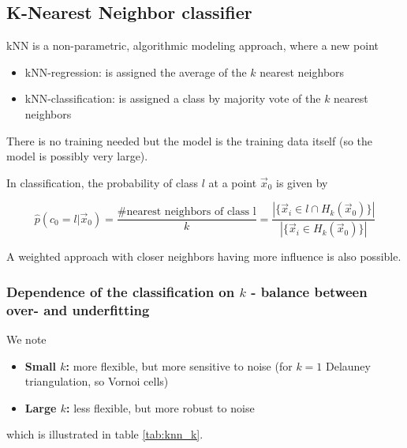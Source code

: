 

\subsection{K-Nearest Neighbor classifier}
kNN is a non-parametric, algorithmic modeling approach, where a new point
\begin{itemize}
    \item kNN-regression: is assigned the average of the $k$ nearest neighbors
    \item kNN-classification: is assigned a class by majority vote of the $k$ nearest neighbors
\end{itemize}
There is \textcolor{green1}{no training needed} but the \textcolor{red1}{model is the training data itself (so the model is possibly very large)}.

In classification, the probability of class $l$ at a point $\vec{x}_0$ is given by

\begin{equation}
    \hat{p}(c_0 = l|\vec{x}_0) = \frac{\# \text{nearest neighbors of class l}}{k} = \frac{|\{ \vec{x}_i \in l \cap H_k(\vec{x}_0) \}|}{|\{ \vec{x}_i \in H_k(\vec{x}_0) \}|}
\end{equation}

A weighted approach with closer neighbors having more influence is also possible.

\subsubsection{Dependence of the classification on $k$ - balance between over- and underfitting}
We note
\begin{itemize}
    \item \textbf{Small $k$:} more flexible, but more sensitive to noise (for $k=1$ Delauney triangulation, so Vornoi cells)
    \item \textbf{Large $k$:} less flexible, but more robust to noise
\end{itemize}
which is illustrated in table \ref{tab:knn_k}.

